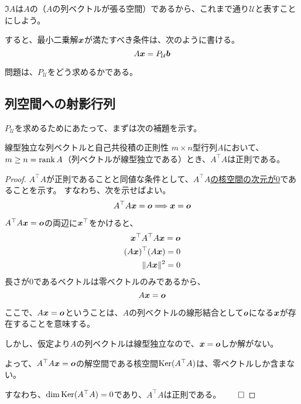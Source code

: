 \documentclass[../../../topic_linear-algebra]{subfiles}
\begin{document}
\br

$\Im A$は$A$の（$A$の列ベクトルが張る空間）であるから、これまで通り$\mathcal{U}$と表すことにしよう。

すると、最小二乗解$\vb*{x}$が満たすべき条件は、次のように書ける。
\begin{equation*}
  A\vb*{x} = P_{\mathcal{U}}\vb*{b}
\end{equation*}

問題は、$P_{\mathcal{U}}$をどう求めるかである。

\subsection{列空間への射影行列}

$P_{\mathcal{U}}$を求めるためにあたって、まずは次の補題を示す。

\begin{theorem}{線型独立な列ベクトルと自己共役積の正則性}
  $m \times n$型行列$A$において、$m \geq n = \rank A$（列ベクトルが線型独立である）とき、$A^\top A$は正則である。
\end{theorem}

\begin{proof}
  $A^\top A$が正則であることと同値な条件として、\hyperref[thm:invertibility-by-kernel]{$A^\top A$の核空間の次元が0}であることを示す。
  すなわち、次を示せばよい。
  \begin{equation*}
    A^\top A \vb*{x} = \vb*{o} \Longrightarrow \vb*{x} = \vb*{o}
  \end{equation*}
  
  $A^\top A \vb*{x} = \vb*{o}$の両辺に$\vb*{x}^\top$をかけると、
  \begin{align*}
    \vb*{x}^\top A^\top A \vb*{x} = \vb*{o} \\
    (A \vb*{x})^\top (A \vb*{x}) = 0 \\
    \| A \vb*{x} \|^2 = 0
  \end{align*}
  長さが0であるベクトルは零ベクトルのみであるから、
  \begin{equation*}
    A \vb*{x} = \vb*{o}
  \end{equation*}
  
  ここで、$A \vb*{x} = \vb*{o}$ということは、$A$の列ベクトルの線形結合として$\vb*{o}$になる$\vb*{x}$が存在することを意味する。
  
  しかし、仮定より$A$の列ベクトルは線型独立なので、$\vb*{x} = \vb*{o}$しか解がない。
  
  \br
  
  よって、$A^\top A \vb*{x} = \vb*{o}$の解空間である核空間$\operatorname{Ker}(A^\top A)$は、零ベクトルしか含まない。

  すなわち、$\dim \operatorname{Ker}(A^\top A) = 0$であり、$A^\top A$は正則である。$\qed$
\end{proof}
\end{document}
